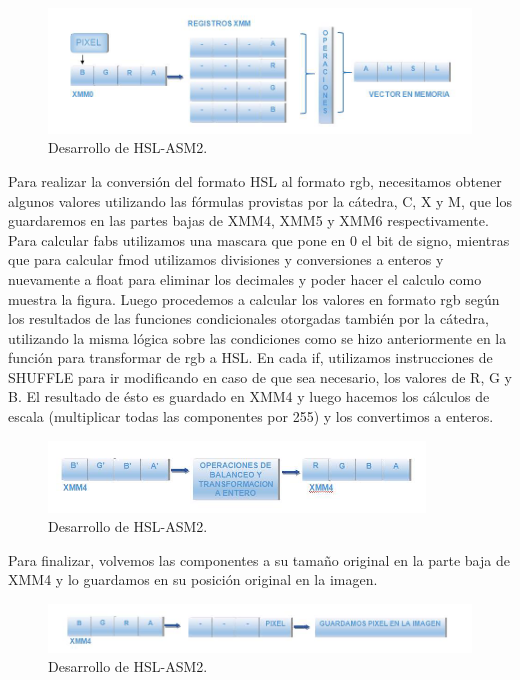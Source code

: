 \begin{figure}[ht!]
\centering
\includegraphics[width=130mm]{imagenes/hsl/hsl2-1.png}
\caption{Desarrollo de HSL-ASM2.}
\end{figure}

Para realizar la conversión del formato HSL al formato rgb, necesitamos obtener algunos valores utilizando las fórmulas provistas por la cátedra, C, X y M, que los guardaremos en las partes bajas de XMM4, XMM5 y XMM6 respectivamente. Para calcular fabs utilizamos una mascara que pone en 0 el bit de signo, mientras que para calcular fmod utilizamos divisiones y conversiones a enteros y nuevamente a float para eliminar los decimales y poder hacer el calculo como muestra la figura. Luego procedemos a calcular los valores en formato rgb según los resultados de las funciones condicionales otorgadas también por la cátedra, utilizando la misma lógica sobre las condiciones como se hizo anteriormente en la función para transformar de rgb a HSL. En cada if, utilizamos instrucciones de SHUFFLE para ir modificando en caso de que sea necesario, los valores de R, G y B. El resultado de ésto es guardado en XMM4 y luego hacemos los cálculos de escala (multiplicar todas las componentes por 255) y los convertimos a enteros.

\begin{figure}[ht!]
\centering
\includegraphics[width=100mm]{imagenes/hsl/hsl2-2.png}
\caption{Desarrollo de HSL-ASM2.}
\end{figure}

Para finalizar, volvemos las componentes a su tamaño original en la parte baja de XMM4 y lo guardamos en su posición original en la imagen.

\begin{figure}[ht!]
\centering
\includegraphics[width=130mm]{imagenes/hsl/hsl2-3.png}
\caption{Desarrollo de HSL-ASM2.}
\end{figure}
